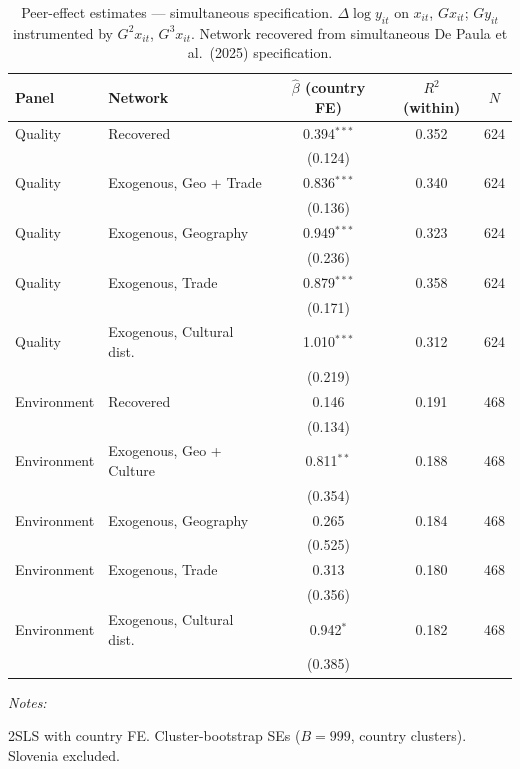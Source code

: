 \documentclass[
  letterpaper,
  DIV=11,
  numbers=noendperiod]{scrartcl}
\begin{document}
\begin{table}[!h]
\centering
\caption{\label{tab:tab:bdf_adjusted_nolag}Peer-effect estimates — simultaneous specification. $\Delta\log y_{it}$ on $x_{it}$, $Gx_{it}$; $Gy_{it}$ instrumented by $G^2x_{it}$, $G^3x_{it}$. Network recovered from simultaneous De Paula et al.\ (2025) specification.}
\centering
\fontsize{9}{11}\selectfont
\begin{threeparttable}
\begin{tabular}[t]{llccc}
\toprule
Panel & Network & $\hat\beta$ (country FE) & $R^2$ (within) & $N$\\
\midrule
Quality & Recovered & 0.394$^{***}$ & 0.352 & 624\\
 &  & (0.124) &  & \\
Quality & Exogenous, Geo + Trade & 0.836$^{***}$ & 0.340 & 624\\
 &  & (0.136) &  & \\
Quality & Exogenous, Geography & 0.949$^{***}$ & 0.323 & 624\\
\addlinespace
 &  & (0.236) &  & \\
Quality & Exogenous, Trade & 0.879$^{***}$ & 0.358 & 624\\
 &  & (0.171) &  & \\
Quality & Exogenous, Cultural dist. & 1.010$^{***}$ & 0.312 & 624\\
 &  & (0.219) &  & \\
\addlinespace
Environment & Recovered & 0.146 & 0.191 & 468\\
 &  & (0.134) &  & \\
Environment & Exogenous, Geo + Culture & 0.811$^{**}$ & 0.188 & 468\\
 &  & (0.354) &  & \\
Environment & Exogenous, Geography & 0.265 & 0.184 & 468\\
\addlinespace
 &  & (0.525) &  & \\
Environment & Exogenous, Trade & 0.313 & 0.180 & 468\\
 &  & (0.356) &  & \\
Environment & Exogenous, Cultural dist. & 0.942$^{*}$ & 0.182 & 468\\
 &  & (0.385) &  & \\
\bottomrule
\end{tabular}
\begin{tablenotes}[para]
\item \textit{Notes:} 
\item 2SLS with country FE. Cluster-bootstrap SEs ($B=999$, country clusters). Slovenia excluded.
\end{tablenotes}
\end{threeparttable}
\end{table}
\end{document}
